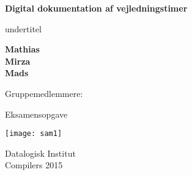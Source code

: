 \begin{titlepage}
    \begin{center}
        \vspace*{1cm}

        \Huge
        \textbf{Digital dokumentation af vejledningstimer}

        \vspace{0.5cm}
        \LARGE
        undertitel

        \vspace{1.5cm}

        \textbf{Mathias}\\
        \textbf{Mirza}\\
        \textbf{Mads }\\

        \vspace{1.5cm}

        Gruppemedlemmere:\\

        \vspace{0.5cm}



        \vfill

        Eksamensopgave

        \vspace{0.8cm}

        \texttt{[image: sam1]}

        \Large
        Datalogisk Institut\\
        Compilers 2015

    \end{center}
\end{titlepage} 
